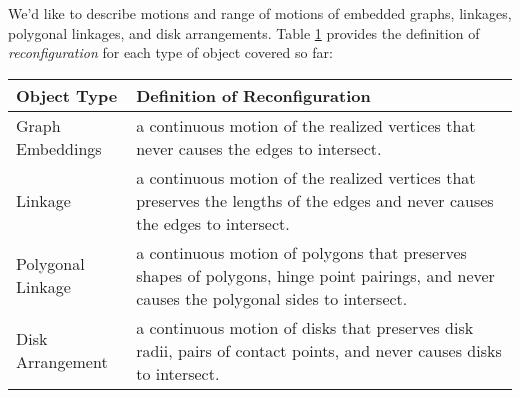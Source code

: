 We'd like to describe motions and range of motions of embedded graphs, linkages, polygonal 
linkages, and disk arrangements.  Table \ref{table:configurationSpace-1} provides the definition of 
\textit{reconfiguration} for each type of object covered so far:
\begin{center}
\begin{table}[htbp!]
\begin{tabular}{|p{}|p{}|}
\hline
Object Type&Definition of Reconfiguration\\\hline
Graph Embeddings&a continuous motion of the realized vertices that never causes the edges to 
intersect.\\\hline
Linkage&a continuous motion of the realized vertices that preserves the lengths of the edges and never 
causes 
the edges to intersect.\\\hline
Polygonal Linkage&a continuous motion of polygons that preserves shapes of polygons, hinge point 
pairings, and never causes the polygonal sides to intersect.\\\hline
Disk Arrangement&a continuous motion of disks that preserves disk radii, pairs of contact points, 
and never causes disks to intersect.\\\hline
\end{tabular}\label{table:configurationSpace-1}
\end{table}
\end{center}








